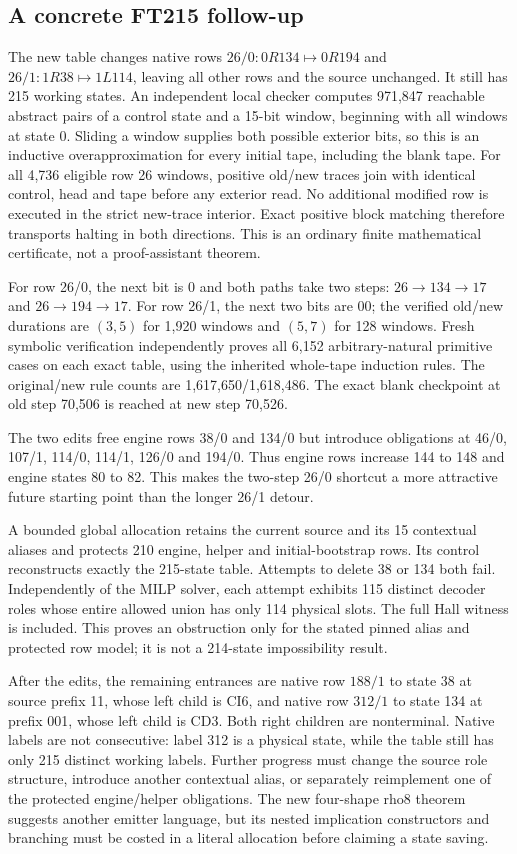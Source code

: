 \subsection{A concrete FT215 follow-up}
The new table changes native rows $26/0:0R134\mapsto0R194$ and
$26/1:1R38\mapsto1L114$, leaving all other rows and the source unchanged.
It still has 215 working states. An independent local checker computes 971,847
reachable abstract pairs of a control state and a 15-bit window, beginning with
all windows at state 0. Sliding a window supplies both possible exterior bits,
so this is an inductive overapproximation for every initial tape, including the
blank tape. For all 4,736 eligible row 26 windows, positive old/new traces join
with identical control, head and tape before any exterior read. No additional
modified row is executed in the strict new-trace interior. Exact positive block
matching therefore transports halting in both directions. This is an ordinary
finite mathematical certificate, not a proof-assistant theorem.

For row 26/0, the next bit is 0 and both paths take two steps:
$26\to 134\to17$ and $26\to194\to17$.
For row 26/1, the next two bits are 00; the verified old/new durations are
$(3,5)$ for 1,920 windows and $(5,7)$ for 128 windows.
Fresh symbolic verification independently proves all 6,152 arbitrary-natural
primitive cases on each exact table, using the inherited whole-tape induction
rules. The original/new rule counts are 1,617,650/1,618,486. The exact blank
checkpoint at old step 70,506 is reached at new step 70,526.

The two edits free engine rows 38/0 and 134/0 but introduce obligations at
46/0, 107/1, 114/0, 114/1, 126/0 and 194/0. Thus engine rows increase 144 to 148 and
engine states 80 to 82. This makes the two-step 26/0 shortcut a more attractive
future starting point than the longer 26/1 detour.

A bounded global allocation retains the current source and its 15 contextual
aliases and protects 210 engine, helper and initial-bootstrap rows. Its control
reconstructs exactly the 215-state table. Attempts to delete 38 or 134 both fail.
Independently of the MILP solver, each attempt exhibits 115 distinct decoder
roles whose entire allowed union has only 114 physical slots. The full Hall
witness is included. This proves an obstruction only for the stated pinned
alias and protected row model; it is not a 214-state impossibility result.

After the edits, the remaining entrances are native row $188/1$ to state 38 at source prefix 11,
whose left child is CI6, and native row $312/1$ to state 134 at prefix 001, whose left child is CD3.
Both right children are nonterminal. Native labels are not consecutive: label 312 is a physical state, while the table still has only 215 distinct working labels. Further progress must change the source
role structure, introduce another contextual alias, or separately reimplement
one of the protected engine/helper obligations. The new four-shape rho8 theorem
suggests another emitter language, but its nested implication constructors and
branching must be costed in a literal allocation before claiming a state saving.
